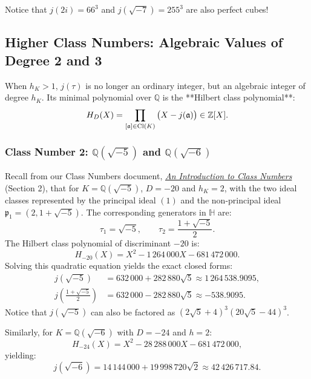 \documentclass[a4paper]{article}
\begin{document}
Notice that $j(2i) = 66^3$ and $j(\sqrt{-7}) = 255^3$ are also perfect cubes!

\subsection{Higher Class Numbers: Algebraic Values of Degree 2 and 3}
When $h_K > 1$, $j(\tau)$ is no longer an ordinary integer, but an algebraic integer of degree $h_K$. Its minimal polynomial over $\mathbb{Q}$ is the **Hilbert class polynomial**:
\begin{equation}
 H_D(X) = \prod_{[\mathfrak{a}] \in \mathrm{Cl}(K)} \big( X - j(\mathfrak{a}) \big) \in \mathbb{Z}[X].
\end{equation}

\subsubsection{Class Number 2: \texorpdfstring{$\mathbb{Q}(\sqrt{-5})$ and $\mathbb{Q}(\sqrt{-6})$}{Q(sqrt(-5)) and Q(sqrt(-6))}}
Recall from our Class Numbers document, \href{class_numbers_main.pdf}{\emph{An Introduction to Class Numbers}} \cite{kerimov2026class} (Section 2), that for $K = \mathbb{Q}(\sqrt{-5})$, $D = -20$ and $h_K = 2$, with the two ideal classes represented by the principal ideal $(1)$ and the non-principal ideal $\mathfrak{p}_1 = (2, 1+\sqrt{-5})$.
The corresponding generators in $\mathbb{H}$ are:
\begin{equation}
 \tau_1 = \sqrt{-5}, \qquad \tau_2 = \frac{1 + \sqrt{-5}}{2}.
\end{equation}
The Hilbert class polynomial of discriminant $-20$ is:
\begin{equation}
 H_{-20}(X) = X^2 - 1\,264\,000 X - 681\,472\,000.
 \label{eq:H_minus_20}
\end{equation}
Solving this quadratic equation yields the exact closed forms:
\begin{align}
 j(\sqrt{-5}) &= 632\,000 + 282\,880\sqrt{5} \approx 1\,264\,538.9095, \\
 j\left(\frac{1+\sqrt{-5}}{2}\right) &= 632\,000 - 282\,880\sqrt{5} \approx -538.9095.
\end{align}
Notice that $j(\sqrt{-5})$ can also be factored as $(2 \sqrt{5} + 4)^3 (20 \sqrt{5} - 44)^3$.

Similarly, for $K = \mathbb{Q}(\sqrt{-6})$ with $D = -24$ and $h = 2$:
\begin{equation}
 H_{-24}(X) = X^2 - 28\,288\,000 X - 681\,472\,000,
\end{equation}
yielding:
\begin{equation}
 j(\sqrt{-6}) = 14\,144\,000 + 19\,998\,720 \sqrt{2} \approx 42\,426\,717.84.
\end{equation}
\end{document}
